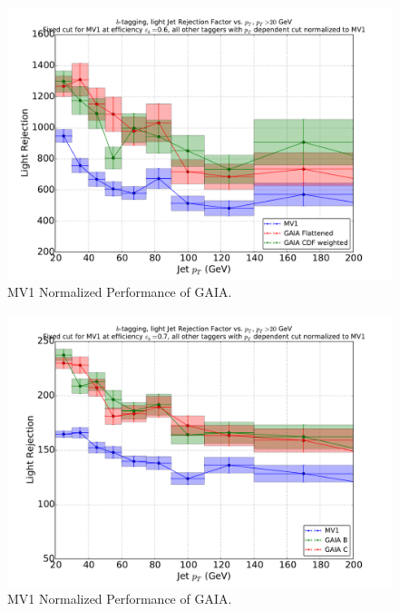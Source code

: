 \begin{figure}
\includegraphics[width=\textwidth]{figures/btag/u_rej_mv1normalized_pTdep_60pct.pdf}
\caption[The ATLAS detector]{MV1 Normalized Performance of GAIA.
\label{fig:urejmv1norm60}}
\end{figure}

\begin{figure}
\includegraphics[width=\textwidth]{figures/btag/u_rej_mv1normalized_pTdep_70pct.pdf}
\caption[The ATLAS detector]{MV1 Normalized Performance of GAIA.
\label{fig:urejmv1norm70}}
\end{figure}

















%







